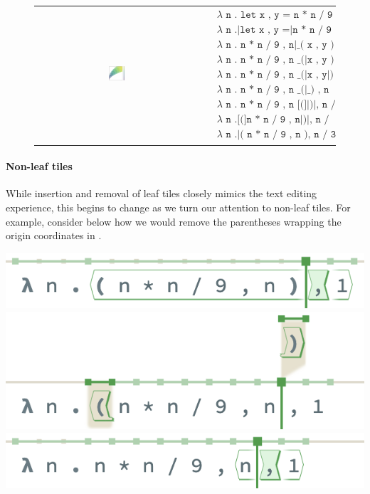 \begin{figure}
  \begin{tabular}{cp{}}
  \includegraphics[width=0.1\textwidth]{img/circles-parabola-grow-2.png}
  &
  {
    \begin{align*}
      & \texttt{$\lambda$ n . let x , y = n * n / 9 , n|in ( x , y ) , n / 3} \\
      & \texttt{$\lambda$ n .|let x , y =|n * n / 9 , n[in] ( x , y ) , n / 3} \\
      & \texttt{$\lambda$ n . n * n / 9 , n|\_ ( x , y ) , n / 3} \\
      & \texttt{$\lambda$ n . n * n / 9 , n \_ (|x , y ) , n / 3} \\
      & \texttt{$\lambda$ n . n * n / 9 , n \_ (|x , y|) , n / 3} \\
      & \texttt{$\lambda$ n . n * n / 9 , n \_ (|\_ ) , n / 3} \\
      & \texttt{$\lambda$ n . n * n / 9 , n [(]|)|, n / 3} \\
      & \texttt{$\lambda$ n .[(]n * n / 9 , n|)|, n / 3} \\
      & \texttt{$\lambda$ n .|( n * n / 9 , n ), n / 3}
    \end{align*}
  }
  \end{tabular}
\end{figure}

\paragraph{Non-leaf tiles}
While insertion and removal of leaf tiles closely mimics the
text editing experience, this begins to change as we turn our
attention to non-leaf tiles.
For example, consider below how we would remove the parentheses
wrapping the origin coordinates in \tylr.

\begin{center}
  \includegraphics[width=0.65\columnwidth]{img/remove-nonleaf-0.png}
  \includegraphics[width=0.65\columnwidth]{img/remove-nonleaf-1.png}
  \includegraphics[width=0.65\columnwidth]{img/remove-nonleaf-2.png}
\end{center}


